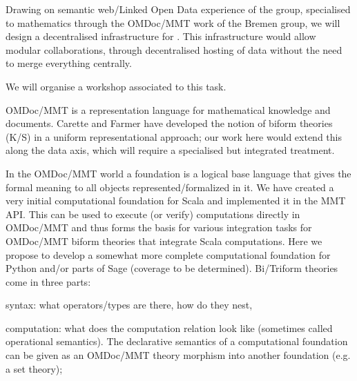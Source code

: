 \begin{workpackage}[id=dksbases,wphases=1-48!.5,
  title=Data/Knowledge/Software-Bases,lead=JU,
  ZHRM=12,JURM=36,UWRM=25,SARM=10,LLRM=2,PSRM=4]
\begin{tasklist}
\begin{task}[id=data-design,lead=JU,partners={ZH,US,SA,UW,LL},
  title={Formulation of requirements and design of new  infrastructure when appropriate}]
  Drawing on semantic web/Linked Open Data experience of the  group, specialised to
  mathematics through the OMDoc/MMT work of the Bremen group, we will design a
  decentralised infrastructure for \TheProject. This infrastructure would allow modular
  collaborations, through decentralised hosting of data without the need to merge
  everything centrally.

 We will organise a workshop associated to this task.
\end{task}

\begin{task}[title=Triform Theories in OMDoc/MMT,id=data-triform,
  lead=JU,partners={ZH}]
OMDoc/MMT is a representation language for mathematical knowledge and documents. Carette and Farmer have developed the notion of biform theories (K/S) in a uniform representational approach; our work here would extend this along the data axis, which will require a specialised but integrated treatment.
\end{task}

\begin{task}[title=Computational Foundation for Python/Sage (or some CAS),
  id=data-foundationCAS,lead=JU,partners={ZH,SA}]

In the OMDoc/MMT world a foundation is a logical base language that
gives the formal meaning to all objects represented/formalized in
it. We have created a very initial computational foundation for Scala
and implemented it in the MMT API. This can be used to execute (or
verify) computations directly in OMDoc/MMT and thus forms the basis
for various integration tasks for OMDoc/MMT biform theories that
integrate Scala computations. Here we propose to develop a somewhat
more complete computational foundation for Python and/or parts of Sage
(coverage to be determined). Bi/Triform theories come in three parts:
\begin{compactitem}

\item syntax: what operators/types are there, how do they nest, 
\item computation:  what does the computation relation look like (sometimes called operational semantics). The declarative semantics of a computational foundation can be given as an OMDoc/MMT theory morphism into another foundation (e.g. a set theory);
\item {}
\end{compactitem}
\end{task}


\end{tasklist}
\end{workpackage}
